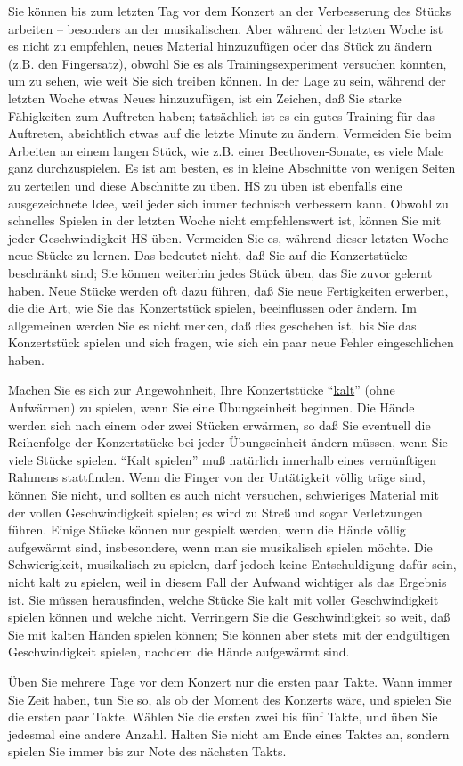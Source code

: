 Sie können bis zum letzten Tag vor dem Konzert an der Verbesserung des Stücks arbeiten -- besonders an der musikalischen.
Aber während der letzten Woche ist es nicht zu empfehlen, neues Material hinzuzufügen oder das Stück zu ändern (z.B. den Fingersatz), obwohl Sie es als Trainingsexperiment versuchen könnten, um zu sehen, wie weit Sie sich treiben können.
In der Lage zu sein, während der letzten Woche etwas Neues hinzuzufügen, ist ein Zeichen, daß Sie starke Fähigkeiten zum Auftreten haben; tatsächlich ist es ein gutes Training für das Auftreten, absichtlich etwas auf die letzte Minute zu ändern.
Vermeiden Sie beim Arbeiten an einem langen Stück, wie z.B. einer Beethoven-Sonate, es viele Male ganz durchzuspielen.
Es ist am besten, es in kleine Abschnitte von wenigen Seiten zu zerteilen und diese Abschnitte zu üben.
HS zu üben ist ebenfalls eine ausgezeichnete Idee, weil jeder sich immer technisch verbessern kann.
Obwohl zu schnelles Spielen in der letzten Woche nicht empfehlenswert ist, können Sie mit jeder Geschwindigkeit HS üben.
Vermeiden Sie es, während dieser letzten Woche neue Stücke zu lernen.
Das bedeutet nicht, daß Sie auf die Konzertstücke beschränkt sind; Sie können weiterhin jedes Stück üben, das Sie zuvor gelernt haben.
Neue Stücke werden oft dazu führen, daß Sie neue Fertigkeiten erwerben, die die Art, wie Sie das Konzertstück spielen, beeinflussen oder ändern.
Im allgemeinen werden Sie es nicht merken, daß dies geschehen ist, bis Sie das Konzertstück spielen und sich fragen, wie sich ein paar neue Fehler eingeschlichen haben.

Machen Sie es sich zur Angewohnheit, Ihre Konzertstücke \enquote{\hyperref[c1iii6g]{kalt}} (ohne Aufwärmen) zu spielen, wenn Sie eine Übungseinheit beginnen.
Die Hände werden sich nach einem oder zwei Stücken erwärmen, so daß Sie eventuell die Reihenfolge der Konzertstücke bei jeder Übungseinheit ändern müssen, wenn Sie viele Stücke spielen.
\enquote{Kalt spielen} muß natürlich innerhalb eines vernünftigen Rahmens stattfinden.
Wenn die Finger von der Untätigkeit völlig träge sind, können Sie nicht, und sollten es auch nicht versuchen, schwieriges Material mit der vollen Geschwindigkeit spielen; es wird zu Streß und sogar Verletzungen führen.
Einige Stücke können nur gespielt werden, wenn die Hände völlig aufgewärmt sind,
insbesondere, wenn man sie musikalisch spielen möchte.
Die Schwierigkeit, musikalisch zu spielen, darf jedoch keine Entschuldigung dafür sein, nicht kalt zu spielen, weil in diesem Fall der Aufwand wichtiger als das Ergebnis ist.
Sie müssen herausfinden, welche Stücke Sie kalt mit voller Geschwindigkeit spielen können und welche nicht.
Verringern Sie die Geschwindigkeit so weit, daß Sie mit kalten Händen spielen können; Sie können aber stets mit der endgültigen Geschwindigkeit spielen, nachdem die Hände aufgewärmt sind. 

Üben Sie mehrere Tage vor dem Konzert nur die ersten paar Takte.
Wann immer Sie Zeit haben, tun Sie so, als ob der Moment des Konzerts wäre, und spielen Sie die ersten paar Takte. 
Wählen Sie die ersten zwei bis fünf Takte, und üben Sie jedesmal eine andere Anzahl.
Halten Sie nicht am Ende eines Taktes an, sondern spielen Sie immer bis zur Note des nächsten Takts.



